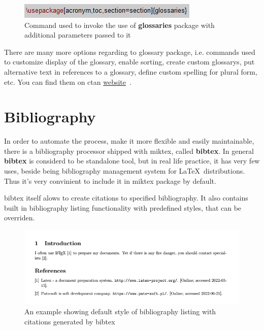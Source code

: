 \begin{figure}[H]
\centering
\includegraphics[scale=1.0]{content/LaTeX/figures/usepackage_glossaries.png}
\caption{Command used to invoke the use of \textbf{glossaries} package with additional parameters passed to it}
\label{fig:usepackage_glossaries}
\end{figure}

There are many more options regarding to \gls{glossary} package, i.e. commands used to customize display of the \gls{glossary}, enable sorting, create custom \glspl{glossary}, put alternative text in references to a \gls{glossary}, define custom spelling for plural form, etc. You can find them on \acrshort{ctan} \href{https://www.ctan.org/pkg/glossaries}{website}~\cite{ctan_glossaries}.

\section{Bibliography}

In order to automate the process, make it more flexible and easily maintainable, there is a bibliography processor shipped with \Gls{miktex}, called \textbf{\Gls{bibtex}}. In general \textbf{\Gls{bibtex}} is considerd to be standalone tool, but in real life practice, it has very few uses, beside being bibliography management system for \LaTeX\ distributions. Thus it's very convinient to include it in \Gls{miktex} package by default.

\Gls{bibtex} itself alows to create citations to specified bibliography. It also contains built in bibliography listing functionality with predefined styles, that can be overriden.

\begin{figure}[H]
\centering
\includegraphics[scale=0.8]{content/LaTeX/figures/biblio_outcome.png}
\caption{An example showing default style of bibliography listing with citations generated by \gls{bibtex}}
\label{fig:bibliography_example}
\end{figure}

